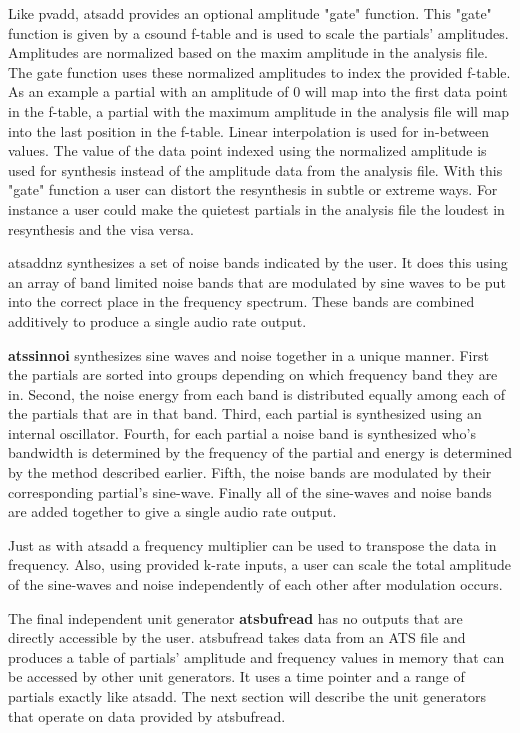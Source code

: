 \documentclass[10pt,letterpaper]{article}
\begin{document}
Like pvadd, atsadd provides an optional amplitude "gate" function.  This "gate" function is given by a csound f-table and is used to scale the partials' amplitudes.  Amplitudes are normalized based on the maxim amplitude in the analysis file.  The gate function uses these normalized amplitudes to index the provided f-table.  As an example a partial with an amplitude of 0 will map into the first data point in the f-table, a partial with the maximum amplitude in the analysis file will map into the last position in the f-table.  Linear interpolation is used for in-between values.  The value of the data point indexed using the normalized amplitude is used for synthesis instead of the amplitude data from the analysis file.  With this "gate" function a user can distort the resynthesis in subtle or extreme ways.  For instance a user could make the quietest partials in the analysis file the loudest in resynthesis and the visa versa.

atsaddnz synthesizes a set of noise bands indicated by the user.  It does this using an array of band limited noise bands that are modulated by sine waves to be put into the correct place in the frequency spectrum.  These bands are combined additively to produce a single audio rate output.

\textbf{atssinnoi} synthesizes sine waves and noise together in a unique manner.  First the partials are sorted into groups depending on which frequency band they are in.  Second, the noise energy from each band is distributed equally among each of the partials that are in that band.  Third, each partial is synthesized using an internal oscillator.  Fourth, for each partial a noise band is synthesized who's bandwidth is determined by the frequency of the partial and energy is determined by the method described earlier.  Fifth, the noise bands are modulated by their corresponding partial's sine-wave.  Finally all of the sine-waves and noise bands are added together to give a single audio rate output.

Just as with atsadd a frequency multiplier can be used to transpose the data in frequency.  Also, using provided k-rate inputs, a user can scale the total amplitude of the sine-waves and noise independently of each other after modulation occurs.

The final independent unit generator \textbf{atsbufread} has no outputs that are directly accessible by the user.  atsbufread takes data from an ATS file and produces a table of partials' amplitude and frequency values in memory that can be accessed by other unit generators.  It uses a time pointer and a range of partials exactly like atsadd.  The next section will describe the unit generators that operate on data provided by atsbufread.
\end{document}
